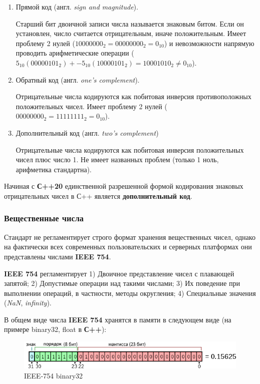 \begin{enumerate}
\def\labelenumi{\arabic{enumi})}
\item
  Прямой код (англ. \emph{sign and magnitude}).

  Старший бит двоичной записи числа называется знаковым битом. Если он
  установлен, число считается отрицательным, иначе положительным. Имеет
  проблему 2 нулей (\(10000000_2=00000000_2=0_{10}\)) и невозможности
  напрямую проводить арифметические операции
  (\(5_{10}(00000101_2) + -5_{10}(10000101_2) = 10001010_2 \ne 0_{10}\)).
\item
  Обратный код (англ. \emph{one's complement}).

  Отрицательные числа кодируются как побитовая инверсия противоположных
  положительных чисел. Имеет проблему 2 нулей
  (\(00000000_2=11111111_2=0_{10}\)).
\item
  Дополнительный код (англ. \emph{two's complement})

  Отрицательные числа кодируются как побитовая инверсия положительных
  чисел плюс число 1. Не имеет названных проблем (только 1 ноль,
  арифметика стандартна).
\end{enumerate}

Начиная с \textbf{С++20} единственной разрешенной формой кодирования
знаковых отрицательных чисел в С++ является \textbf{дополнительный код}.

\subsubsection{Вещественные
числа}\label{ux432ux435ux449ux435ux441ux442ux432ux435ux43dux43dux44bux435-ux447ux438ux441ux43bux430}

Стандарт не регламентирует строго формат хранения вещественных чисел,
однако на фактически всех современных пользовательских и серверных
платформах они представлены числами \textbf{IEEE 754}.

\textbf{IEEE 754} регламентирует 1) Двоичное представление чисел с
плавающей запятой; 2) Допустимые операции над такими числами; 3) Их
поведение при выполнении операций, в частности, методы округления; 4)
Специальные значения (\emph{NaN}, \emph{infinity}).

В общем виде числа \textbf{IEEE 754} хранятся в памяти в следующем виде
(на примере binary32, float в \textbf{С++}):

\begin{figure}
\centering
\includegraphics{./res/ieee-binary32.png}
\caption{IEEE-754 binary32}
\end{figure}

